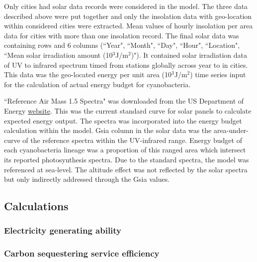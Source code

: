 \documentclass[../thesis.tex]{subfiles} %
\begin{document}
Only cities had solar data records were considered in the model.  The three data described above were put together and only the insolation data with geo-location within considered cities were extracted.  Mean values of hourly insolation per area data for cities with more than one insolation record.  The final solar data was containing 
 rows and 6 columns (``Year", ``Month", ``Day", ``Hour", ``Location", ``Mean solar irradiation amount (10$^{3}$J/m$^{2}$)").  It contained solar irradiation data of UV to infrared spectrum timed from 
 stations globally across year 
 to 
 in 
 cities.  This data was the geo-located energy per unit area (10$^{3}$J/m$^{2}$) time series input for the calculation of actual energy budget for cyanobacteria.

``Reference Air Mass 1.5 Spectra" was downloaded from the US Department of Energy \href{https://www.nrel.gov/grid/solar-resource/spectra-am1.5.html}{website}.  This was the current standard curve for solar panels to calculate expected energy output.  The spectra was incorporated into the energy budget calculation within the model.  Gsia column in the solar data was the area-under-curve of the reference spectra within the UV-infrared range.  Energy budget of each cyanobacteria lineage was a proportion of this ranged area which intersect its reported photosynthesis spectra.  Due to the standard spectra, the model was referenced at sea-level.  The altitude effect was not reflected by the solar spectra but only indirectly addressed through the Gsia values.

\subsection{Calculations}
\subsubsection{Electricity generating ability}

\subsubsection{Carbon sequestering service efficiency}
\end{document}
